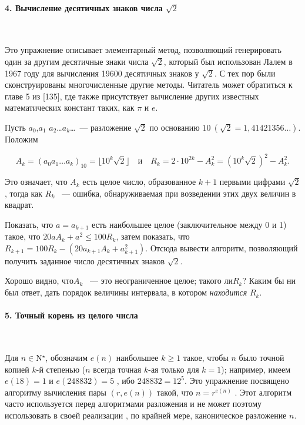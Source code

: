 \documentclass{mai_book}
\begin{document}
\paragraph { 4. Вычисление десятичных знаков числа $\sqrt{2}$}\ \newline

Это упражнение описывает элементарный метод, позволяющий генерировать один за другим десятичные знаки числа $\sqrt{2}$, который был использован Лалем в 1967 году для вычисления 19600 десятичных знаков у $\sqrt{2}$. С тех пор были сконструированы многочисленные другие методы. Читатель может обратиться к главе 5 из [135], где также присутствует вычисление других известных математических констант таких, как ${\pi}$ и ${e}$.

Пусть $ a_{0}$,$a_{1}$ $a_{2}$\dots $a_{k}$\dots ~--- разложение $\sqrt{2}$ по основанию $10~(\sqrt{2}=1,41421356 \dots)$. Положим 

\begin{equation*}
A_{k}=\left(a_{0}a_{1}\ldots a_{k}\right)_{10}=\lfloor{10^{k}\sqrt{2}}\rfloor \quad\text{и}\quad R_{k}=2\cdot10^{2k}-A_k^2=\left({10^{k}\sqrt{2}}\right)^{2}-A_k^2.
\end{equation*}

\newpage
	

\noindent Это означает, что $A_{k}$ есть целое число, образованное $k+1$ первыми цифрами $\sqrt{2}$, тогда как $R_{k}$ ~--- ошибка, обнаруживаемая при возведении этих двух величин в квадрат.

Показать, что $a=a_{k+1}$ есть наибольшее целое (заключительное между 0 и 1) такое, что $20aA_{k}+a^{2}\leq{100R_{k}}$, затем показать, что $R_{k+1}=100R_{k} - \left({20a_{k+1}A_{k}+ a_{k+1}^2}\right)$. Отсюда вывести алгоритм, позволяющий получить заданное число десятичных знаков $\sqrt{2}$. 

Хорошо видно, что$ A_{k}$ ~--- это неограниченное целое; такого ли$ R_{k}$?
Каким бы ни был ответ, дать порядок величины интервала, в котором \textit{находится} $R_{k}$.

\paragraph{5. Точный корень из целого числа}\ \newline

Для $n \in $N${^\star}$, обозначим $e\left({n}\right)$  наибольшее $k\geq{1}$ такое, чтобы $n$ было точной копией $k$-й степенью ($n$  всегда точная $k$-ая только для $k=1$); например, имеем $e\left({18}\right)=1$ и $e\left({248832}\right)=5$ , ибо $248832=12^{5}$. Это упражнение посвящено алгоритму вычисления пары $\left({r,e\left({n}\right)}\right)$  такой, что $n=r^{e\left({n}\right)}$ . Этот алгоритм часто используется перед алгоритмами разложения и не может поэтому использовать в своей реализации , по крайней мере,  каноническое разложение $n$.
\end{document}
